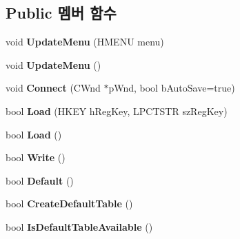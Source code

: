 \subsection*{Public 멤버 함수}
\begin{DoxyCompactItemize}
\item 
\mbox{\label{class_c_accelerator_manager_ac7411d20f413ea0ec3bd65705b564adf}} 
void {\bfseries Update\+Menu} (H\+M\+E\+NU menu)
\item 
\mbox{\label{class_c_accelerator_manager_ac854ec5263a7bab961bf63aec3938984}} 
void {\bfseries Update\+Menu} ()
\item 
\mbox{\label{class_c_accelerator_manager_a2d01e04665e3d03f3c1410bd69b0a82c}} 
void {\bfseries Connect} (C\+Wnd $\ast$p\+Wnd, bool b\+Auto\+Save=true)
\item 
\mbox{\label{class_c_accelerator_manager_a8e87ae6f5464a4fa052c91c0ee361b6d}} 
bool {\bfseries Load} (H\+K\+EY h\+Reg\+Key, L\+P\+C\+T\+S\+TR sz\+Reg\+Key)
\item 
\mbox{\label{class_c_accelerator_manager_a289a9052abea7302d9322283f93cbce6}} 
bool {\bfseries Load} ()
\item 
\mbox{\label{class_c_accelerator_manager_a6ddd05a54ab0e66bc6ca8a7af3742e61}} 
bool {\bfseries Write} ()
\item 
\mbox{\label{class_c_accelerator_manager_aa510a36964ed209de5f7325efa713bf6}} 
bool {\bfseries Default} ()
\item 
\mbox{\label{class_c_accelerator_manager_aaefac809b336df14e1a1a7d60f72ae28}} 
bool {\bfseries Create\+Default\+Table} ()
\item 
\mbox{\label{class_c_accelerator_manager_a508e56037762d035758491d12fd10dfa}} 
bool {\bfseries Is\+Default\+Table\+Available} ()
\item 
\mbox{\label{class_c_accelerator_manager_a6773f028b9c0b04c9a7b6d02c1a96be0}} 

\end{DoxyCompactItemize}
